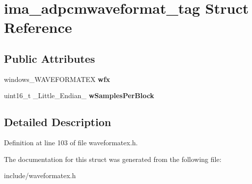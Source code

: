 \hypertarget{structima__adpcmwaveformat__tag}{\section{ima\-\_\-adpcmwaveformat\-\_\-tag Struct Reference}
\label{structima__adpcmwaveformat__tag}
}
\subsection*{Public Attributes}
\begin{DoxyCompactItemize}
\item 
\hypertarget{structima__adpcmwaveformat__tag_af1ed157f8c606087e750f6848bb89a07}{windows\-\_\-\-W\-A\-V\-E\-F\-O\-R\-M\-A\-T\-E\-X {\bfseries wfx}}\label{structima__adpcmwaveformat__tag_af1ed157f8c606087e750f6848bb89a07}

\item 
\hypertarget{structima__adpcmwaveformat__tag_a7013475127c8eae66ab5d1cd9faf61b1}{uint16\-\_\-t \-\_\-\-Little\-\_\-\-Endian\-\_\- {\bfseries w\-Samples\-Per\-Block}}\label{structima__adpcmwaveformat__tag_a7013475127c8eae66ab5d1cd9faf61b1}

\end{DoxyCompactItemize}


\subsection{Detailed Description}


Definition at line 103 of file waveformatex.\-h.



The documentation for this struct was generated from the following file\-:\begin{DoxyCompactItemize}
\item 
include/waveformatex.\-h\end{DoxyCompactItemize}
